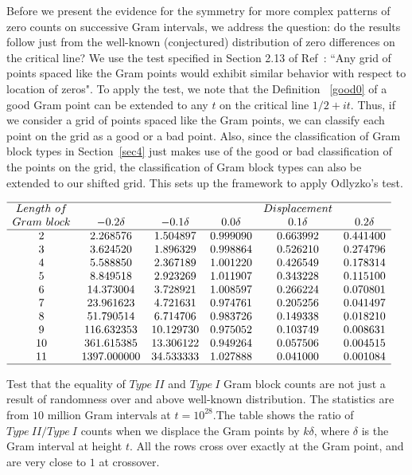 \documentclass[twoside]{article}
\theoremstyle{definition}
\begin{document}
Before we present the evidence for the symmetry for more complex patterns of zero counts on successive Gram intervals, we address the question: do the results follow just from the well-known (conjectured) distribution of zero differences on the critical line? We use the test specified in Section 2.13 of Ref~\cite{Odlyzko 1992}: ``Any grid of points spaced like the Gram points would exhibit similar behavior with respect to location of zeros". 
To apply the test, we note  that the Definition ~\ref{good0} of a good Gram point can be extended to any $t$ on the critical line $1/2+it$. Thus, if we consider a  grid of points spaced like the Gram points, we can classify each point on the grid as a good or a bad point. Also, since the classification of Gram block types in Section~\ref{sec4} just makes use of the good or bad classification of the points on the grid, the classification of Gram block types can also be extended to our shifted grid. This sets up the framework to apply Odlyzko's test.

\begin{table}
\centering \(\begin{array}{cccccc}
\hline
Length~of 	& &&&Displacement \\
Gram~block	& -0.2\delta & -0.1\delta & 0.0\delta & 0.1\delta & 0.2\delta  \\
\hline
2 &2.268576&1.504897&0.999090&0.663992&0.441400 \\
3 &3.624520&1.896329&0.998864&0.526210&0.274796 \\
4 &5.588850&2.367189&1.001220&0.426549&0.178314 \\
5 &8.849518&2.923269&1.011907&0.343228&0.115100 \\
6 &14.373004&3.728921&1.008597&0.266224&0.070801 \\
7 &23.961623&4.721631&0.974761&0.205256&0.041497 \\
8 &51.790514&6.714706&0.983726&0.149338&0.018210 \\
9 &116.632353&10.129730&0.975052&0.103749&0.008631 \\
10 &361.615385&13.306122&0.949264&0.057506&0.004515 \\
11 &1397.000000&34.533333&1.027888&0.041000&0.001084 \\
\hline
\end{array}\)
\caption{Test that the equality of $Type~II$ and $Type~I$ Gram block counts are not just a result of randomness over and above well-known distribution. The statistics are from $10$ million Gram intervals at $t=10^{28}$.The table shows the ratio of $Type~II/Type~I$ counts when we displace the Gram points by $k\delta$, where $\delta$ is the Gram interval at height $t$. All the rows cross over exactly at the Gram point, and are very close to $1$ at crossover. }
\label{tab:rosserrandom}
\end{table}
\end{document}
